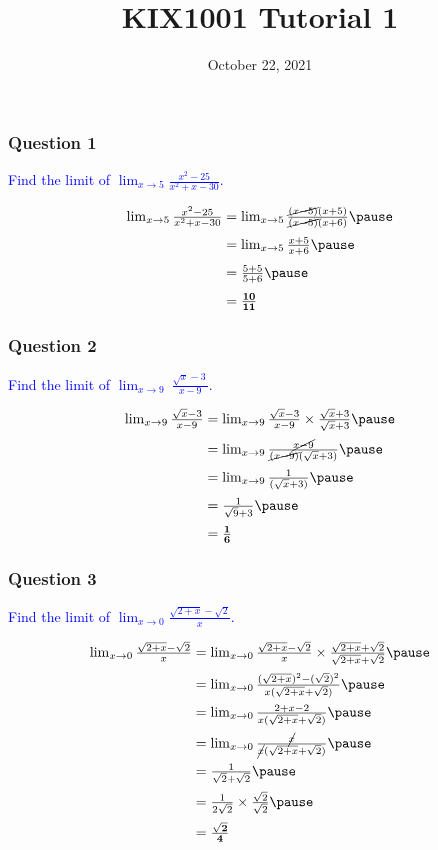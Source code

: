 \documentclass[12pt,fleqn]{beamer}
\title{KIX1001 Tutorial 1}
\author[Hong Vin]{}
\date{October 22, 2021}
\newcommand{\question}[1]{\textcolor{blue}{#1}}
\begin{document}
\begin{frame}[t]
\frametitle{Question 1}

\question{Find the limit of $\displaystyle \lim _{x\rightarrow 5}\frac{x^{2} -25}{x^{2} +x-30}$.}

\[
\begin{array}{@{}r @{{}={}} l@{}} 
\lim _{x\rightarrow 5}\frac{x^{2} -25}{x^{2} +x-30} & \lim _{x\rightarrow 5}\frac{\cancel{(x-5)} (x+5)}{\cancel{(x-5)} (x+6)}\pause\\[8pt]
 & \lim _{x\rightarrow 5}\frac{x+5}{x+6}\pause\\[8pt]
 & \frac{5+5}{5+6}\pause\\[8pt]
 & \mathbf{\frac{10}{11}}
\end{array}
\]
\end{frame}

\begin{frame}[t]
\frametitle{Question 2}

\question{Find the limit of $\displaystyle \lim _{x\rightarrow 9} \ \frac{\sqrt{x} -3\ }{x-9}$.}

\[
\begin{array}{@{}r @{{}={}} l@{}} 
\lim _{x\rightarrow 9}\frac{\sqrt{x} -3}{x-9} & \lim _{x\rightarrow 9}\frac{\sqrt{x} -3}{x-9} \times \frac{\sqrt{x} +3}{\sqrt{x} +3}\pause\\[8pt]
 & \lim _{x\rightarrow 9}\frac{\cancel{x-9}}{\cancel{(x-9)} (\sqrt{x} +3)}\pause\\[8pt]
 & \lim _{x\rightarrow 9}\frac{1}{(\sqrt{x} +3)}\pause\\[8pt]
 & \frac{1}{\sqrt{9} +3}\pause\\[8pt]
 & \mathbf{\frac{1}{6}}
\end{array}
\]
\end{frame}

\begin{frame}[t]
\frametitle{Question 3}

\question{Find the limit of $\displaystyle \lim _{x\rightarrow 0}\frac{\sqrt{2+x} -\sqrt{2}}{x}$.}

\[
\begin{array}{@{}r @{{}={}} l@{}} 
\lim _{x\rightarrow 0}\frac{\sqrt{2+x} -\sqrt{2}}{x} & \lim _{x\rightarrow 0}\frac{\sqrt{2+x} -\sqrt{2}}{x} \times \frac{\sqrt{2+x} +\sqrt{2}}{\sqrt{2+x} +\sqrt{2}}\pause\\[8pt]
 & \lim _{x\rightarrow 0}\frac{(\sqrt{2+x} )^{2} -(\sqrt{2} )^{2}}{x(\sqrt{2+x} +\sqrt{2} )}\pause\\[8pt]
 & \lim _{x\rightarrow 0}\frac{2+x-2}{x(\sqrt{2+x} +\sqrt{2} )}\pause\\[8pt]
 & \lim _{x\rightarrow 0}\frac{\cancel{x}}{\cancel{x} (\sqrt{2+x} +\sqrt{2} )}\pause\\[8pt]
 & \frac{1}{\sqrt{2} +\sqrt{2}}\pause\\[8pt]
 & \frac{1}{2\sqrt{2}} \times \frac{\sqrt{2}}{\sqrt{2}}\pause\\[8pt]
 & \mathbf{\frac{\sqrt{2}}{4}}
\end{array}
\]
\end{frame}
\end{document}
